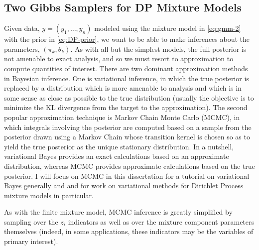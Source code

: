   \subsection{Two Gibbs Samplers for DP Mixture Models}
  \label{sec:gibbs-sampler-dp}

  Given data, $y = (y_1, \dots, y_n)$ modeled using the mixture
  model in \eqref{eq:gmm-2} with the prior in \eqref{eq:DP-prior}, 
  we want to be able to make inferences about the parameters, $(\pi_k,
  \theta_k)$.  As with all but the simplest models, the full posterior
  is not amenable to exact analysis, and so we must resort to
  approximation to compute quantities of interest.  There are two
  dominant approximation methods in Bayesian inference.  One is variational
  inference, in which the true posterior is replaced by a distribution
  which is more amenable to analysis and which is in some sense as
  close as possible to the true distribution (usually the objective is
  to minimize the KL divergence from the target to the
  approximation).  The second popular approximation technique is
  Markov Chain Monte Carlo (MCMC), in which integrals involving the posterior
  are computed based on a sample from the posterior drawn using a
  Markov Chain whose transition kernel is chosen so as to yield the
  true posterior as the unique stationary distribution.  In a
  nutshell, variational Bayes provides an exact calculations based on an
  approximate distribution, whereas MCMC provides approximate
  calculations based on the true posterior.  I will focus on MCMC in
  this dissertation \citet{fox2012tutorial} for a tutorial on
  variational Bayes generally and \citet{blei2006variational} and
  \citet{kurihara2007collapsed} for work on variational methods for
  Dirichlet Process mixture models in particular.
  
  As with the finite mixture model, MCMC inference is greatly
  simplified by sampling over the $z_i$ indicators as well as over the
  mixture component parameters themselves (indeed, in some
  applications, these indicators may be the variables of primary
  interest).

  
